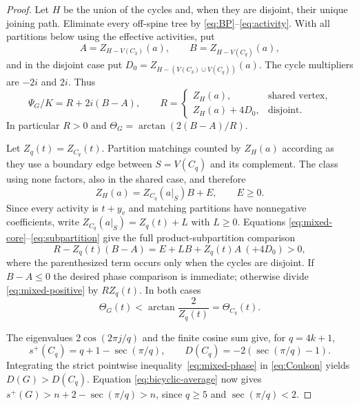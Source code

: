 \documentclass[11pt]{article}
\theoremstyle{remark}
\begin{document}
\begin{proof}
Let $H$ be the union of the cycles and, when they are disjoint, their unique
joining path.  Eliminate every off-spine tree by
\eqref{eq:BP}--\eqref{eq:activity}.  With all partitions below using the
effective activities, put
\[
 A=Z_{H-V(C_3)}(a),\qquad B=Z_{H-V(C_q)}(a),
\]
and in the disjoint case put
$D_0=Z_{H-(V(C_3)\cup V(C_q))}(a)$.  The cycle multipliers are $-2i$ and
$2i$.  Thus
\begin{equation}\label{eq:mixed-core}
 \Psi_G/K=R+2i(B-A),\qquad
 R=\begin{cases}Z_H(a),&\text{shared vertex},\\
 Z_H(a)+4D_0,&\text{disjoint}.
 \end{cases}
\end{equation}
In particular $R>0$ and
$\Theta_G=\arctan(2(B-A)/R)$.

Let $Z_q(t)=Z_{C_q}(t)$.  Partition matchings counted by $Z_H(a)$ according
as they use a boundary edge between $S=V(C_q)$ and its complement.  The class
using none factors, also in the shared case, and therefore
\begin{equation}\label{eq:subpartition}
 Z_H(a)=Z_{C_q}(a|_S)B+E,
 \qquad E\geq0.
\end{equation}
Since every activity is $t+y_v$ and matching partitions have nonnegative
coefficients, write $Z_{C_q}(a|_S)=Z_q(t)+L$ with $L\geq0$.  Equations
\eqref{eq:mixed-core}--\eqref{eq:subpartition} give the full
product-subpartition comparison
\begin{equation}\label{eq:mixed-positive}
 R-Z_q(t)(B-A)=E+LB+Z_q(t)A\ (+4D_0)>0,
\end{equation}
where the parenthesized term occurs only when the cycles are disjoint.  If
$B-A\leq0$ the desired phase comparison is immediate; otherwise divide
\eqref{eq:mixed-positive} by $RZ_q(t)$.  In both cases
\begin{equation}\label{eq:mixed-phase}
 \Theta_G(t)<\arctan\frac2{Z_q(t)}=\Theta_{C_q}(t).
\end{equation}

The eigenvalues $2\cos(2\pi j/q)$ and the finite cosine sum give, for
$q=4k+1$,
\[
 s^+(C_q)=q+1-\sec(\pi/q),\qquad
 D(C_q)=-2(\sec(\pi/q)-1).
\]
Integrating the strict pointwise inequality~\eqref{eq:mixed-phase} in
\eqref{eq:Coulson} yields $D(G)>D(C_q)$.  Equation
\eqref{eq:bicyclic-average} now gives
$s^+(G)>n+2-\sec(\pi/q)>n$, since $q\geq5$ and
$\sec(\pi/q)<2$.
\end{proof}
\end{document}
